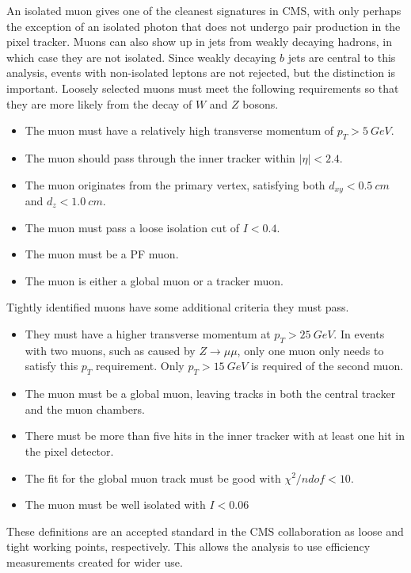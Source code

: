 An isolated muon gives one of the cleanest signatures in CMS,
with only perhaps the exception of an isolated photon that does not
undergo pair production in the pixel tracker.
Muons can also show up in jets from weakly decaying hadrons,
in which case they are not isolated.
Since weakly decaying $b$ jets are central to this analysis,
events with non-isolated leptons are not rejected,
but the distinction is important.
Loosely selected muons must meet the following requirements so that they
are more likely from the decay of $W$ and $Z$ bosons.
\begin{itemize}
\item The muon must have a relatively high transverse momentum of $p_T > \SI{5}{GeV}$.
\item The muon should pass through the inner tracker within $|\eta| < 2.4$.
\item The muon originates from the primary vertex, satisfying both
  $d_{xy} < \SI{0.5}{cm}$ and $d_z < \SI{1.0}{cm}$.
\item The muon must pass a loose isolation cut of $I < 0.4$.
\item The muon must be a PF muon.
\item The muon is either a global muon or a tracker muon.
\end{itemize}
Tightly identified muons have some additional criteria they must pass.
\begin{itemize}
\item They must have a higher transverse momentum at $p_T > \SI{25}{GeV}$.
  In events with two muons, such as caused by $Z \rightarrow \mu\mu$,
  only one muon only needs to satisfy this $p_T$ requirement.
  Only $p_T > \SI{15}{GeV}$ is required of the second muon.
\item The muon must be a global muon, leaving tracks in both the central tracker
  and the muon chambers.
\item There must be more than five hits in the inner tracker with at least one hit in the pixel detector.
\item The fit for the global muon track must be good with $\chi^2/ndof < 10$.
\item The muon must be well isolated with $I < 0.06$
\end{itemize}

These definitions are an accepted standard in the CMS collaboration
as loose and tight working points, respectively.
This allows the analysis to use efficiency measurements created for wider use.

